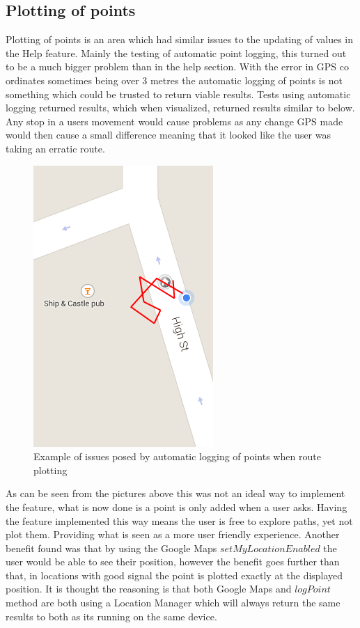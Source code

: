 \subsection{Plotting of points}
Plotting of points is an area which had similar issues to the updating of values in the Help feature. Mainly the testing of automatic point logging, this turned out to be a much bigger problem than in the help section. With the error in GPS co ordinates sometimes being over 3 metres\cite{gps} the automatic logging of points is not something which could be trusted to return viable results. Tests using automatic logging returned results, which when visualized, returned results similar to below. Any stop in a users movement would cause problems as any change GPS made would then cause a small difference meaning that it looked like the user was taking an erratic route.
\begin{figure}[H]
\includegraphics[scale=0.5]{Chapter3/erratic.png} 
\caption[Erratic Route Display]{Example of issues posed by automatic logging of points when route plotting}
\end{figure}
As can be seen from the pictures above this was not an ideal way to implement the feature, what is now done is a point is only added when a user asks. Having the feature implemented this way means the user is free to explore paths, yet not plot them. Providing what is seen as a more user friendly experience. Another benefit found was that by using the Google Maps $setMyLocationEnabled$\cite{setlocation} the user would be able to see their position, however the benefit goes further than that, in locations with good signal the point is plotted exactly at the displayed position. It is thought the reasoning is that both Google Maps and $logPoint$ method are both using a Location Manager which will always return the same results to both as its running on the same device.
